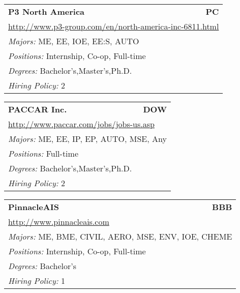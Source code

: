 \documentclass[twoside]{article}
\begin{document}
\begin{center}
\begin{multicols}{3}
\begin{FlushLeft}
\begin{minipage}{.9\columnwidth}
\end{minipage}
 
\begin{minipage}{.9\columnwidth}\begin{tabularx}{.95\columnwidth}{Xr}
                 {\Large\bf P3 North America} & {\Large\bf PC}\\
    \multicolumn{2}{p{.95\columnwidth}}{\url{http://www.p3-group.com/en/north-america-inc-6811.html}}\\
    \multicolumn{2}{p{.95\columnwidth}}{\emph{Majors:} ME, EE, IOE, EE:S, AUTO}\\
    \multicolumn{2}{p{.95\columnwidth}}{\emph{Positions:} Internship, Co-op, Full-time}\\
    \multicolumn{2}{p{.95\columnwidth}}{\emph{Degrees:} Bachelor's,Master's,Ph.D.}\\
    \multicolumn{2}{p{.95\columnwidth}}{\emph{Hiring Policy:} 2}\\
    \end{tabularx}
    
\end{minipage}
 
\begin{minipage}{.9\columnwidth}\begin{tabularx}{.95\columnwidth}{Xr}
                 {\Large\bf PACCAR Inc.} & {\Large\bf DOW}\\
    \multicolumn{2}{p{.95\columnwidth}}{\url{http://www.paccar.com/jobs/jobs-us.asp}}\\
    \multicolumn{2}{p{.95\columnwidth}}{\emph{Majors:} ME, EE, IP, EP, AUTO, MSE, Any}\\
    \multicolumn{2}{p{.95\columnwidth}}{\emph{Positions:} Full-time}\\
    \multicolumn{2}{p{.95\columnwidth}}{\emph{Degrees:} Bachelor's,Master's,Ph.D.}\\
    \multicolumn{2}{p{.95\columnwidth}}{\emph{Hiring Policy:} 2}\\
    \end{tabularx}
    
\end{minipage}
 
\begin{minipage}{.9\columnwidth}\begin{tabularx}{.95\columnwidth}{Xr}
                 {\Large\bf PinnacleAIS} & {\Large\bf BBB}\\
    \multicolumn{2}{p{.95\columnwidth}}{\url{http://www.pinnacleais.com}}\\
    \multicolumn{2}{p{.95\columnwidth}}{\emph{Majors:} ME, BME, CIVIL, AERO, MSE, ENV, IOE, CHEME}\\
    \multicolumn{2}{p{.95\columnwidth}}{\emph{Positions:} Internship, Co-op, Full-time}\\
    \multicolumn{2}{p{.95\columnwidth}}{\emph{Degrees:} Bachelor's}\\
    \multicolumn{2}{p{.95\columnwidth}}{\emph{Hiring Policy:} 1}\\
    \end{tabularx}
    

\end{minipage}
\end{FlushLeft}
\end{multicols}
\end{center}
\end{document}
